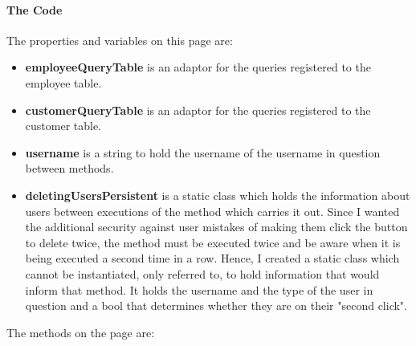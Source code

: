 ﻿\documentclass{article}
\begin{document}
    \paragraph{The Code}
    The properties and variables on this page are:
    \begin{itemize}
        \item \textbf{employeeQueryTable} is an adaptor for the queries registered to the employee table.
        \item \textbf{customerQueryTable} is an adaptor for the queries registered to the customer table.
        \item \textbf{username} is a string to hold the username of the username in question between methods.
        \item \textbf{deletingUsersPersistent} is a static class which holds the information about users between executions of the method which carries it out.
        Since I wanted the additional security against user mistakes of making them click the button to delete twice, the method must be executed twice and be aware when it is being executed a second time in a row.
        Hence, I created a static class which cannot be instantiated, only referred to, to hold information that would inform that method.
        It holds the username and the type of the user in question and a bool that determines whether they are on their "second click".
    \end{itemize}
    The methods on the page are:
\end{document}
